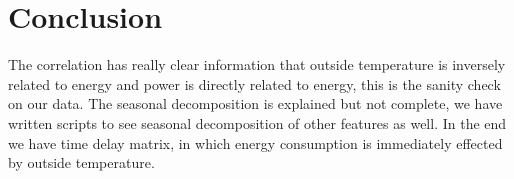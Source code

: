 \documentclass{scrartcl}
\begin{document}
\section{Conclusion} 
 The correlation has really clear information that outside temperature is inversely related to energy and power is directly related to energy, this is the sanity check on our data. The seasonal decomposition is explained but not complete, we have written scripts to see seasonal decomposition of other features as well. In the end we have time delay matrix, in which energy consumption is immediately effected by outside temperature.












%



\end{document}
